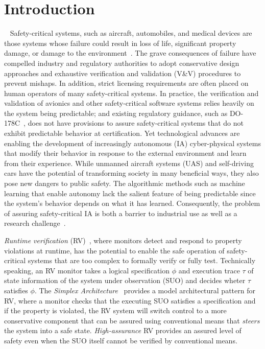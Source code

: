 \section{Introduction}~\label{sec:intro} Safety-critical systems, such
as aircraft, automobiles, and medical devices are those systems whose
failure could result in loss of life, significant property damage, or
damage to the environment~\cite{Knight2002}.  The grave consequences
of failure have compelled industry and regulatory authorities to adopt
conservative design approaches and exhaustive verification and
validation (V\&V) procedures to prevent mishaps. In addition, strict
licensing requirements are often placed on human operators of many
safety-critical systems.  In practice, the verification and validation
of avionics and other safety-critical software systems relies heavily
on the system  being predictable; and existing regulatory guidance, such as
DO-178C~\cite{DO178B}, does not have provisions to assure
safety-critical systems that do not exhibit predictable behavior at
certification.  Yet technological advances are enabling the
development of increasingly autonomous (IA) cyber-physical systems
that modify their behavior in response to the external environment and
learn from their experience.  While unmanned aircraft systems (UAS)
and self-driving cars have the potential of transforming society in
many beneficial ways, they also pose new dangers to public safety. The
algorithmic methods such as machine learning that enable autonomy lack
the salient feature of being predictable since the system's behavior
depends on what it has learned.  Consequently, the problem of assuring
safety-critical IA is both a barrier to industrial use  as well as a
research challenge~\cite{NRC14}.


\emph{Runtime verification} (RV)~\cite{monitors}, where monitors
detect and respond to property violations at runtime, has the
potential to enable the safe operation of safety-critical systems that
are too complex to formally verify or fully test.  Technically
speaking, an RV monitor takes a logical specification $\phi$ and
execution trace $\tau$ of state information of the system under
observation (SUO) and decides wheter $\tau$ satisfies $\phi$. The
\emph{Simplex Architecture}~\cite{simplex} provides a model
architectural pattern for RV, where a monitor checks that the
executing SUO satisfies a specification and if the property is
violated, the RV system will switch control to a more conservative
component that can be assured using conventional means that
\emph{steers} the system into a safe state. \emph{High-assurance} RV
provides an assured level of safety even when the SUO itself cannot be
verified by conventional means.


